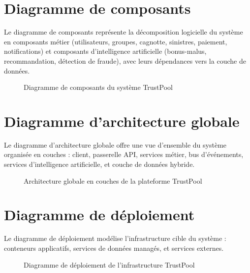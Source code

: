 \documentclass[12pt,a4paper]{report}
\begin{document}
\section{Diagramme de composants}
Le diagramme de composants représente la décomposition logicielle du système en composants métier (utilisateurs, groupes, cagnotte, sinistres, paiement, notifications) et composants d'intelligence artificielle (bonus-malus, recommandation, détection de fraude), avec leurs dépendances vers la couche de données.

\begin{figure}[H]
    \centering
    \caption{Diagramme de composants du système TrustPool}
    \label{fig:composants}
\end{figure}

\section{Diagramme d'architecture globale}
Le diagramme d'architecture globale offre une vue d'ensemble du système organisée en couches : client, passerelle API, services métier, bus d'événements, services d'intelligence artificielle, et couche de données hybride.

\begin{figure}[H]
    \centering
    \caption{Architecture globale en couches de la plateforme TrustPool}
    \label{fig:architecture-globale}
\end{figure}

\section{Diagramme de déploiement}
Le diagramme de déploiement modélise l'infrastructure cible du système : conteneurs applicatifs, services de données managés, et services externes.

\begin{figure}[H]
    \centering
    \caption{Diagramme de déploiement de l'infrastructure TrustPool}
    \label{fig:deploiement}
\end{figure}
\end{document}

